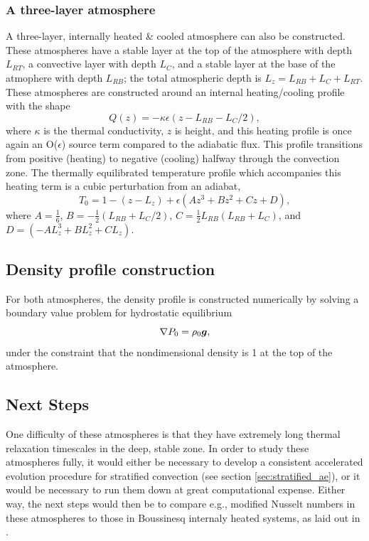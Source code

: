 \subsubsection{A three-layer atmosphere}
A three-layer, internally heated \& cooled atmosphere can also be constructed.
These atmospheres have a stable layer at the top of the atmosphere with depth $L_{RT}$, a convective layer with depth $L_C$, and a stable layer at the base of the atmophere with depth $L_{RB}$; the total atmospheric depth is $L_z = L_{RB} + L_C + L_{RT}$.
These atmospheres are constructed around an internal heating/cooling profile with the shape
\begin{equation}
Q(z) = -\kappa \epsilon(z - L_{RB} - L_C/2),
\end{equation}
where $\kappa$ is the thermal conductivity, $z$ is height, and this heating profile is once again an O($\epsilon$) source term compared to the adiabatic flux.
This profile transitions from positive (heating) to negative (cooling) halfway through the convection zone.
The thermally equilibrated temperature profile which accompanies this heating term is a cubic perturbation from an adiabat,
\begin{equation}
T_0 = 1 - (z - L_z) + \epsilon(A z^3 + B z^2 + Cz + D),
\end{equation}
where $A = \frac{1}{6}$, $B = -\frac{1}{2}(L_{RB} + L_C/2)$, $C = \frac{1}{2}L_{RB}(L_{RB} + L_C)$, and $D = (-AL_z^3 + BL_z^2 + CL_z)$.

\subsection{Density profile construction}
For both atmospheres, the density profile is constructed numerically by solving a boundary value problem for hydrostatic equilibrium
\begin{equation}
\nabla P_0 = \rho_0 \bm{g},
\end{equation}
under the constraint that the nondimensional density is 1 at the top of the atmosphere.

\subsection{Next Steps}
One difficulty of these atmospheres is that they have extremely long thermal relaxation timescales in the deep, stable zone.
In order to study these atmospheres fully, it would either be necessary to develop a consistent accelerated evolution procedure for stratified convection (see section \ref{sec:stratified_ae}), or it would be necessary to run them down at great computational expense.
Either way, the next steps would then be to compare e.g., modified Nusselt numbers in these atmospheres to those in Boussinesq internaly heated systems, as laid out in \citet{goluskin2016}.


